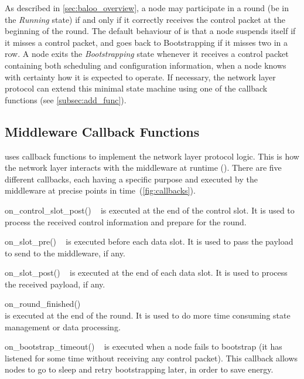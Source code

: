 As described in \cref{sec:baloo_overview}, a node may participate in a round (\ie be in the \textsl{Running} state) if and only if it correctly receives the control packet at the beginning of the round.
%
The default behaviour of \baloo is that a node suspends itself if it misses a control packet, and goes back to Bootstrapping if it misses two in a row. A node exits the \textsl{Bootstrapping} state whenever it receives a control packet containing both scheduling and configuration information, \ie when a node knows with certainty how it is expected to operate.
%
If necessary, the network layer protocol can extend this minimal state machine using one of the callback functions (see \cref{subsec:add_func}).

\subsection{Middleware Callback Functions}
\label{subsec:CB}

\baloo uses callback functions to implement the network layer protocol logic. This is how the network layer interacts with the middleware at runtime ().
%
There are five different callbacks, each having a specific purpose and executed by the middleware at precise points in time~(\cref{fig:callbacks}).

\begin{functions}

	\item[on\_control\_slot\_post()]~\newline
	is executed at the end of the control slot.
	It is used to process the received control information and prepare for the round.

	\item[on\_slot\_pre()]~\newline
	is executed before each data slot.
	It is used to pass the payload to send to the middleware, if any.

	\item[on\_slot\_post()]~\newline
	is executed at the end of each data slot.
	It is used to process the received payload, if any.

	\item[on\_round\_finished()]~\\
	is executed at the end of the round.
	It is used to do more time consuming state management or data processing.

	\item[on\_bootstrap\_timeout()]~\newline
	is executed when a node fails to bootstrap (\ie it has listened for some time without receiving any control packet).
	This callback allows nodes to go to sleep and retry bootstrapping later, in order to save energy.

\end{functions}

